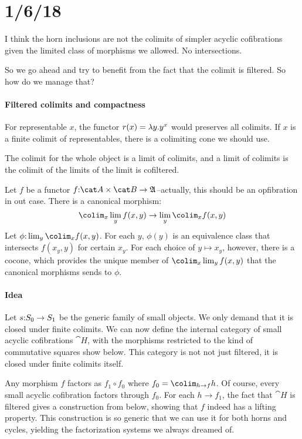 \documentclass[csh.tex]{subfiles}
\begin{document}
\section{1/6/18}

I think the horn inclusions are not the colimits of simpler acyclic cofibrations given the limited class of morphisms we allowed. No intersections.

So we go ahead and try to benefit from the fact that the colimit is filtered. So how do we manage that?

\paragraph{Filtered colimits and compactness}
For representable $x$, the functor $r(x) = \lambda y . y^x$ would preserves all colimits. If $x$ is a finite colimit of representables, there is a colimiting cone we should  use.

The colimit for the whole object is a limit of colimits, and a limit of colimits is the colimit of the limits of the limit is cofiltered.

Let $f$ be a functor $f\of \cat A\times \cat B\to\ambient$--actually, this should be an opfibration in out case. There is a canonical morphism:
\[ \colim_x \lim_y f(x,y) \to \lim_y \colim_x f(x,y) \]
Let $\phi\of\lim_y \colim_x f(x,y)$. For each $y$, $\phi(y)$ is an equivalence class that intersects $f(x_y,y)$ for certain $x_y$. For each choice of $y\mapsto x_y$, however, there is a cocone, which provides the unique member of $\colim_x \lim_y f(x,y)$ that the canonical morphisms sends to $\phi$.

\paragraph{Idea}
Let $s\mathord : S_0\to S_1$ be the generic family of small objects. We only demand that it is closed under finite colimits. We can now define the internal category of small acyclic cofibrations $\cat H$, with the morphisms restricted to the kind of commutative squares show below. This category is not not just filtered, it is closed under finite colimits itself.

Any morphism $f$ factors as $f_1\circ f_0$ where $f_0 = \colim_{h\to f} h$. Of course, every small acyclic cofibration factors through $f_0$. For each $h\to f_1$, the fact that $\cat H$ is filtered gives a construction from below, showing that $f$ indeed has a lifting property. This construction is so generic that we can use it for both horns and cycles, yielding the factorization systems we always dreamed of.
\end{document}
